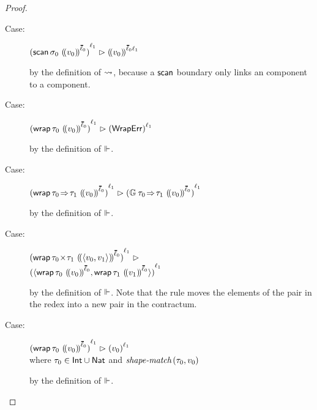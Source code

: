 \documentclass[ twoside,open=right,titlepage,numbers=noenddot,headinclude,%
                footinclude=true,cleardoublepage=empty,abstract=off,
                BCOR=5mm,paper=a4,fontsize=11pt,%
                ngerman,american,%
                parts,pdfspacing]{scrreprt}
\begin{document}
{\begin{proof}
\begin{description}
  \item[Case:]
    \(\obars{\escan{\sshape_0}{\obbars{\svalue_0}{\sownerlist_0}}}{\sowner_1} \snr \obbars{\svalue_0}{\fconcat{\sownerlist_0}{\sowner_1}}\)
  \item[]
    by the definition of $\rightsquigarrow$, because a $\mathsf{scan}{}$ boundary only links an \suntyped{} component to a \sshallow{} component.

  \item[Case:]
    \(\obars{\ewrap{\stype_0}{\obbars{\svalue_0}{\sownerlist_0}}}{\sowner_1} \snr \obars{\swraperror}{\sowner_1}\)
  \item[]
    by the definition of $\Vdash$.

  \item[Case:]
    \(\obars{\ewrap{\tfun{\stype_0}{\stype_1}}{\obbars{\svalue_0}{\sownerlist_0}}}{\sowner_1} \snr \obars{\emon{\tfun{\stype_0}{\stype_1}}{\obbars{\svalue_0}{\sownerlist_0}}}{\sowner_1}\)
  \item[]
    by the definition of $\Vdash$.

  \item[Case:]
    \(\obars{\ewrap{\tpair{\stype_0}{\stype_1}}{\obbars{\epair{\svalue_0}{\svalue_1}}{\sownerlist_0}}}{\sowner_1} \snr\)
    \\\qquad\(\obars{\epair{\ewrap{\stype_0}{\obbars{\svalue_0}{\sownerlist_0}}}{\ewrap{\stype_1}{\obbars{\svalue_1}{\sownerlist_0}}}}{\sowner_1}\)
  \item[]
    by the definition of $\Vdash$.
    Note that the rule moves the elements of the pair in the redex into a new pair in the contractum.

  \item[Case:]
  \(\obars{\ewrap{\stype_0}{\obbars{\svalue_0}{\sownerlist_0}}}{\sowner_1} \snr \obars{\svalue_0}{\sowner_1}\)
  \\ where $\tau_0 \in \mathsf{Int} \cup \mathsf{Nat}$ and $\textit{shape-match}\,(\tau_0,v_0)$
  \item[]
    by the definition of $\Vdash$.

  \end{description}
\end{proof}}

\end{document}
